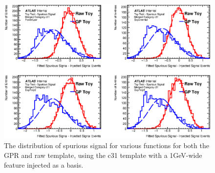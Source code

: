 \begin{figure} 
\begin{center}
  \includegraphics[width=\textwidth]{figures/background/gpr/validation/ToyTest_FitSigVals_Merged_Category_c31Sig.eps}  
    \caption{The distribution of spurious signal for various functions for both the GPR and raw template, using the c31 template with a 1GeV-wide feature injected as a basis.}
\label{fig:c31Sig}
\end{center}
\end{figure}

\clearpage

